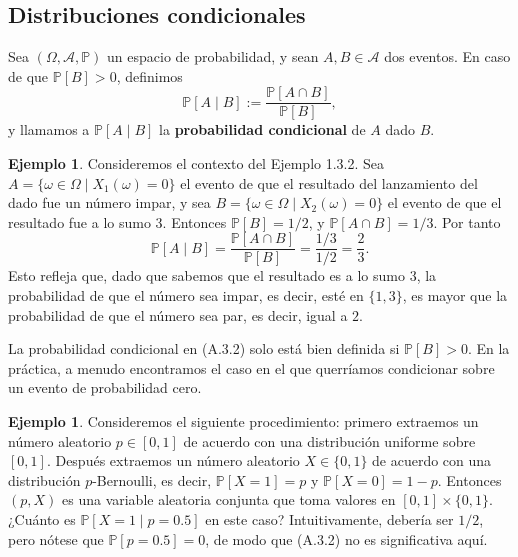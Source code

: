 \documentclass[11pt]{report}
\theoremstyle{definition}
\newtheorem{ejemplo}[definicion]{Ejemplo}
\theoremstyle{plain}
\numberwithin{equation}{section}
\begin{document}
\subsection{Distribuciones condicionales}

Sea \((\Omega,\mathcal{A},\mathbb{P})\) un espacio de probabilidad, y sean \(A,B\in\mathcal{A}\) dos eventos. En caso de que \(\mathbb{P}[B]>0\), definimos
\begin{equation*}
    \mathbb{P}[A\mid B]
    :=
    \frac{\mathbb{P}[A\cap B]}{\mathbb{P}[B]},
    \tag{A.3.2}
\end{equation*}
y llamamos a \(\mathbb{P}[A\mid B]\) la \textbf{probabilidad condicional} de \(A\) dado \(B\).

\begin{ejemplo}
Consideremos el contexto del Ejemplo 1.3.2. Sea \(A=\{\omega\in\Omega\mid X_1(\omega)=0\}\) el evento de que el resultado del lanzamiento del dado fue un número impar, y sea \(B=\{\omega\in\Omega\mid X_2(\omega)=0\}\) el evento de que el resultado fue a lo sumo \(3\). Entonces \(\mathbb{P}[B]=1/2\), y \(\mathbb{P}[A\cap B]=1/3\). Por tanto
\begin{equation*}
    \mathbb{P}[A\mid B]
    =
    \frac{\mathbb{P}[A\cap B]}{\mathbb{P}[B]}
    =
    \frac{1/3}{1/2}
    =
    \frac{2}{3}.
\end{equation*}
Esto refleja que, dado que sabemos que el resultado es a lo sumo \(3\), la probabilidad de que el número sea impar, es decir, esté en \(\{1,3\}\), es mayor que la probabilidad de que el número sea par, es decir, igual a \(2\).
\end{ejemplo}

La probabilidad condicional en (A.3.2) solo está bien definida si \(\mathbb{P}[B]>0\). En la práctica, a menudo encontramos el caso en el que querríamos condicionar sobre un evento de probabilidad cero.

\begin{ejemplo}
Consideremos el siguiente procedimiento: primero extraemos un número aleatorio \(p\in[0,1]\) de acuerdo con una distribución uniforme sobre \([0,1]\). Después extraemos un número aleatorio \(X\in\{0,1\}\) de acuerdo con una distribución \(p\)-Bernoulli, es decir, \(\mathbb{P}[X=1]=p\) y \(\mathbb{P}[X=0]=1-p\). Entonces \((p,X)\) es una variable aleatoria conjunta que toma valores en \([0,1]\times\{0,1\}\). ¿Cuánto es \(\mathbb{P}[X=1\mid p=0.5]\) en este caso? Intuitivamente, debería ser \(1/2\), pero nótese que \(\mathbb{P}[p=0.5]=0\), de modo que (A.3.2) no es significativa aquí.
\end{ejemplo}
\end{document}
